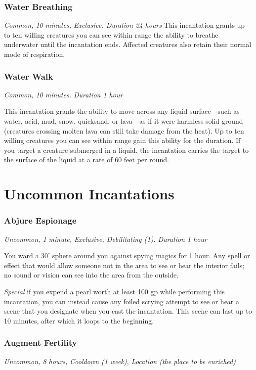 \subsubsection{Water Breathing}
\textit{Common, 10 minutes, Exclusive. Duration 24 hours}
This incantation grants up to ten willing creatures you can see within range the ability to breathe underwater until the incantation ends. Affected creatures also retain their normal mode of respiration.

\subsubsection{Water Walk}
\textit{Common, 10 minutes. Duration 1 hour}

This incantation grants the ability to move across any liquid surface—such as water, acid, mud, snow, quicksand, or lava—as if it were harmless solid ground (creatures crossing molten lava can still take damage from the heat). Up to ten willing creatures you can see within range gain this ability for the duration. If you target a creature submerged in a liquid, the incantation carries the target to the surface of the liquid at a rate of 60 feet per round.

\section{Uncommon Incantations}
\subsubsection{Abjure Espionage}
\textit{Uncommon, 1 minute, Exclusive, Debilitating (1). Duration 1 hour}

You ward a 30' sphere around you against spying magics for 1 hour. Any spell or effect that would allow someone not in the area to see or hear the interior fails; no sound or vision can see into the area from the outside.

\textit{Special} if you expend a pearl worth at least 100 gp while performing this incantation, you can instead cause any foiled scrying attempt to see or hear a scene that you designate when you cast the incantation. This scene can last up to 10 minutes, after which it loops to the beginning.

\subsubsection{Augment Fertility}
\textit{Uncommon, 8 hours, Cooldown (1 week), Location (the place to be enriched)}

